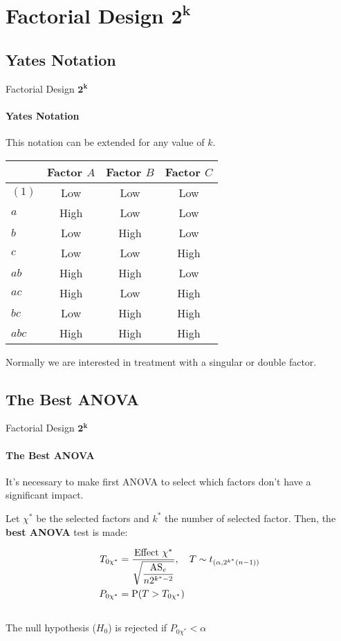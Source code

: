 \section{Factorial Design $\pmb{2^k}$}
\subsection{Yates Notation}
\begin{frame}{Factorial Design $\pmb{2^k}$}
\framesubtitle{Yates Notation}
    This notation can be extended for any value of $k$.
\begin{table}[H]
\begin{tabular}{lccc}
\hline
      & Factor $A$ & Factor $B$ & Factor $C$ \\ \hline
$(1)$ & Low        & Low        & Low        \\
$a$   & High       & Low        & Low        \\
$b$   & Low        & High       & Low        \\
$c$   & Low        & Low        & High       \\
$ab$  & High       & High       & Low        \\
$ac$  & High       & Low        & High       \\
$bc$  & Low        & High       & High       \\
$abc$ & High       & High       & High       \\ \hline
\end{tabular}
\end{table}
    Normally we are interested in treatment with a singular or double factor.
\end{frame}

\subsection{The Best ANOVA}
\begin{frame}{Factorial Design $\pmb{2^k}$}
    \framesubtitle{The Best ANOVA}
It's necessary to make first ANOVA to select which factors don't have a significant impact.\\ \pause

Let $\chi^*$ be the selected factors and $k^*$ the number of selected factor. Then, the \textbf{best ANOVA} test is made:

\begin{align*}
    T_{0\chi^*} &= \dfrac{\text{Effect } \chi^*}{\sqrt{\dfrac{\text{AS}_e}{n2^{k^*-2}}}}, \quad T \sim t_{(\alpha,2^{k^*}(n-1))}\\ \vspace{0.5cm}
    P_{0\chi^*} &= \mathrm{P}(T>T_{0\chi^*})\\\vspace{0.5cm}
\end{align*}
The null hypothesis ($H_0$) is rejected if $P_{0\chi^*} < \alpha$

\end{frame}

